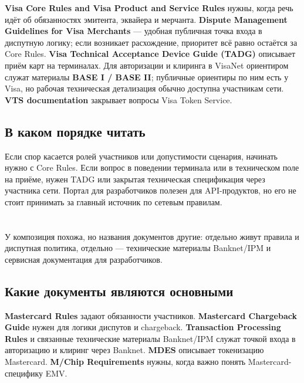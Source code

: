 \textbf{Visa Core Rules and Visa Product and Service Rules}
нужны, когда речь идёт об обязанностях эмитента, эквайера
и мерчанта. \textbf{Dispute Management Guidelines for Visa Merchants}
--- удобная публичная точка входа в диспутную логику; если
возникает расхождение, приоритет всё равно остаётся за Core Rules.
\textbf{Visa Technical Acceptance Device Guide (TADG)}
описывает приём карт на терминалах. Для авторизации и клиринга
в VisaNet ориентиром служат материалы \textbf{BASE I / BASE II};
публичные ориентиры по ним есть у Visa, но рабочая техническая
детализация обычно доступна участникам сети.
\textbf{VTS documentation} закрывает вопросы Visa Token Service.

\subsection*{В каком порядке читать}

Если спор касается ролей участников или допустимости сценария,
начинать нужно с Core Rules. Если вопрос в поведении терминала
или в техническом поле на приёме, нужен TADG или закрытая
техническая спецификация через участника сети. Портал
для разработчиков  полезен
для API-продуктов, но его не стоит принимать за главный источник
по сетевым правилам.

\section{}
\label{sec:ps-mastercard}

У  композиция похожа, но названия документов
другие: отдельно живут правила и диспутная политика, отдельно ---
технические материалы Banknet/IPM и сервисная документация
для разработчиков.

\subsection*{Какие документы являются основными}

\textbf{Mastercard Rules} задают обязанности участников.
\textbf{Mastercard Chargeback Guide} нужен для логики диспутов
и chargeback. \textbf{Transaction Processing Rules}
и связанные технические материалы Banknet/IPM служат точкой
входа в авторизацию и клиринг через Banknet.
\textbf{MDES} описывает токенизацию Mastercard.
\textbf{M/Chip Requirements} нужны, когда важно понять
Mastercard-специфику EMV.

